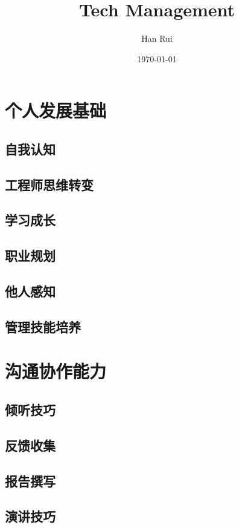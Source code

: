 \documentclass[openany,10pt,UTF8]{ctexbook}
\title{Tech Management}
\author{Han Rui}
\date{\today}
\begin{document}
\maketitle
\tableofcontents

\part{个人发展基础}
\chapter{自我认知}

\chapter{工程师思维转变}

\chapter{学习成长}

\chapter{职业规划}

\chapter{他人感知}

\chapter{管理技能培养}


\part{沟通协作能力}
\chapter{倾听技巧}

\chapter{反馈收集}

\chapter{报告撰写}

\chapter{演讲技巧}

\end{document}
